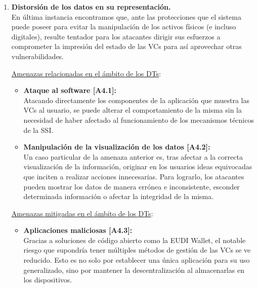 \documentclass[../main.tex]{subfiles}
\begin{document}
\begin{enumerate}[label=\textbf{R4.\arabic*}, leftmargin=48pt]
    \item \textbf{Distorsión de los datos en su representación.}\label{R4.1}
    \\ En última instancia encontramos que, ante las protecciones que el sistema puede poseer para evitar la manipulación de los activos físicos (e incluso digitales), resulte tentador para los atacantes dirigir sus esfuerzos a comprometer la impresión del estado de las \acrshort{VC}s para así aprovechar otras vulnerabilidades.

    \underline{Amenazas relacionadas en el ámbito de los \acrshort{DT}s}:
    \begin{itemize}
        \item \textbf{Ataque al software [A4.1]:}\label{A4.1}
        \\ Atacando directamente los componentes de la aplicación que muestra las \acrshort{VC}s al usuario, se puede alterar el comportamiento de la misma sin la necesidad de haber afectado al funcionamiento de los mecanismos técnicos de la \acrshort{SSI}.
        \item \textbf{Manipulación de la visualización de los datos [A4.2]:}\label{A4.2}
        \\ Un caso particular de la amenaza anterior es, tras afectar a la correcta visualización de la información, originar en los usuarios ideas equivocadas que inciten a realizar acciones innecesarias. Para lograrlo, los atacantes pueden mostrar los datos de manera errónea e inconsistente, esconder determinada información o afectar la integridad de la misma.
    \end{itemize}
    
    \underline{Amenazas mitigadas en el ámbito de los \acrshort{DT}s}: 
    \begin{itemize}
        \item \textbf{Aplicaciones maliciosas [A4.3]:}\label{A4.3}
        \\ Gracias a soluciones de código abierto como la \acrshort{EUDI Wallet}, el notable riesgo que supondría tener múltiples métodos de gestión de las \acrshort{VC}s se ve reducido. Esto es no solo por establecer una única aplicación para su uso generalizado, sino por mantener la descentralización al almacenarlas en los dispositivos. 
        \\
    \end{itemize}
\end{enumerate}
\end{document}
